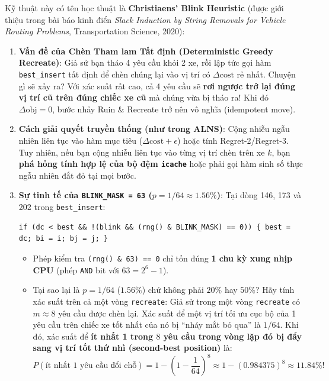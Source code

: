 \documentclass[11pt,a4paper]{article}
\theoremstyle{definition}
\begin{document}
Kỹ thuật này có tên học thuật là \textbf{Christiaens' Blink Heuristic} (được giới thiệu trong bài báo kinh điển \textit{Slack Induction by String Removals for Vehicle Routing Problems}, Transportation Science, 2020):

\begin{enumerate}[leftmargin=1.5em]
    \item \textbf{Vấn đề của Chèn Tham lam Tất định (Deterministic Greedy Recreate)}:
    Giả sử bạn tháo 4 yêu cầu khỏi 2 xe, rồi lập tức gọi hàm \texttt{best\_insert} tất định để chèn chúng lại vào vị trí có $\Delta \text{cost}$ rẻ nhất. Chuyện gì sẽ xảy ra? Với xác suất rất cao, cả 4 yêu cầu sẽ \textbf{rơi ngược trở lại đúng vị trí cũ trên đúng chiếc xe cũ} mà chúng vừa bị tháo ra! Khi đó $\Delta \text{obj} = 0$, bước nhảy Ruin \& Recreate trở nên vô nghĩa (idempotent move).
    \item \textbf{Cách giải quyết truyền thống (như trong ALNS)}:
    Cộng nhiễu ngẫu nhiên liên tục vào hàm mục tiêu ($\Delta \text{cost} + \epsilon$) hoặc tính Regret-2/Regret-3. Tuy nhiên, nếu bạn cộng nhiễu liên tục vào từng vị trí chèn trên xe $k$, bạn \textbf{phá hỏng tính hợp lệ của bộ đệm \texttt{icache}} hoặc phải gọi hàm sinh số thực ngẫu nhiên đắt đỏ tại mọi bước.
    \item \textbf{Sự tinh tế của \texttt{BLINK\_MASK = 63} ($p = 1/64 \approx 1.56\%$)}:
    Tại dòng 146, 173 và 202 trong \texttt{best\_insert}:
    \begin{lstlisting}
if (dc < best && !(blink && (rng() & BLINK_MASK) == 0)) { best = dc; bi = i; bj = j; }
    \end{lstlisting}
    \begin{itemize}[leftmargin=1.2em]
        \item Phép kiểm tra \texttt{(rng() \& 63) == 0} chỉ tốn đúng \textbf{1 chu kỳ xung nhịp CPU} (phép \texttt{AND} bit với $63 = 2^6 - 1$).
        \item Tại sao lại là $p = 1/64$ ($1.56\%$) chứ không phải $20\%$ hay $50\%$?
        Hãy tính xác suất trên cả một vòng \texttt{recreate}: Giả sử trong một vòng \texttt{recreate} có $m \approx 8$ yêu cầu được chèn lại. Xác suất để một vị trí tối ưu cục bộ của 1 yêu cầu trên chiếc xe tốt nhất của nó bị ``nháy mắt bỏ qua'' là $1/64$. Khi đó, xác suất để \textbf{ít nhất 1 trong $8$ yêu cầu trong vòng lặp đó bị đẩy sang vị trí tốt thứ nhì (second-best position)} là:
        \[
            P(\text{ít nhất 1 yêu cầu đổi chỗ}) = 1 - \left(1 - \frac{1}{64}\right)^8 \approx 1 - (0.984375)^8 \approx \mathbf{11.84\%}!
        \]

\end{itemize}
\end{enumerate}
\end{document}
